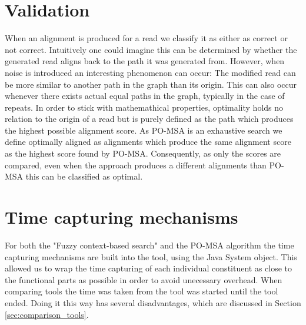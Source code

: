 \documentclass[thesis.tex]{subfiles}
\begin{document}
\section{Validation}
\label{sec:performance_validation}
When an alignment is produced for a read we classify it as either as correct or not correct. Intuitively one could imagine this can be determined by whether the generated read aligns back to the path it was generated from. However, when noise is introduced an interesting phenomenon can occur: The modified read can be more similar to another path in the graph than its origin. This can also occur whenever there exists actual equal paths in the graph, typically in the case of repeats. In order to stick with mathemathical properties, optimality holds no relation to the origin of a read but is purely defined as the path which produces the highest possible alignment score. As PO-MSA is an exhaustive search we define optimally aligned as alignments which produce the same alignment score as the highest score found by PO-MSA. Consequently, as only the scores are compared, even when the approach produces a different alignments than PO-MSA this can be classified as optimal.\\
\par\noindent
\section{Time capturing mechanisms}
For both the "Fuzzy context-based search" and the PO-MSA algorithm the time capturing mechanisms are built into the tool, using the Java System object. This allowed us to wrap the time capturing of each individual constituent as close to the functional parts as possible in order to avoid unecessary overhead. When comparing tools the time was taken from the tool was started until the tool ended. Doing it this way has several disadvantages, which are discussed in Section \ref{sec:comparison_tools}.
\end{document}
